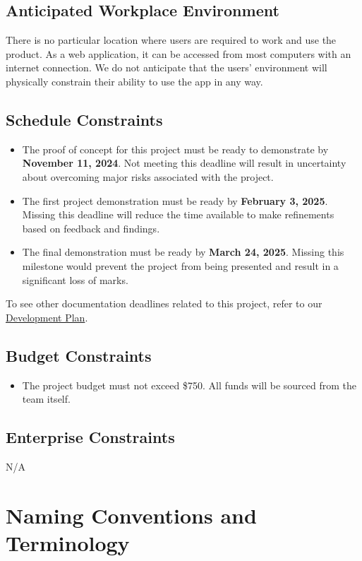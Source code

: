 \documentclass[12pt]{article}
\begin{document}
\subsection{Anticipated Workplace Environment}
There is no particular location where users are required to work and use the product. As a web application, it can be accessed from most computers with an internet connection. We do not anticipate that the users' environment will physically constrain their ability to use the app in any way.
\subsection{Schedule Constraints}
\begin{itemize}
  \item The proof of concept for this project must be ready to demonstrate by \textbf{November 11, 2024}. Not meeting this deadline will result in uncertainty about overcoming major risks associated with the project.
  \item The first project demonstration must be ready by \textbf{February 3, 2025}. Missing this deadline will reduce the time available to make refinements based on feedback and findings.
  \item The final demonstration must be ready by \textbf{March 24, 2025}. Missing this milestone would prevent the project from being presented and result in a significant loss of marks.
\end{itemize}
To see other documentation deadlines related to this project, refer to our \href{https://github.com/OKKM-insights/OKKM.insights/blob/main/docs/DevelopmentPlan/DevelopmentPlan.pdf}{Development Plan}. 
\subsection{Budget Constraints}
\begin{itemize}
  \item The project budget must not exceed \$750. All funds will be sourced from the team itself.
\end{itemize}
\subsection{Enterprise Constraints}
N/A
\newpage
\section{Naming Conventions and Terminology}
\end{document}
